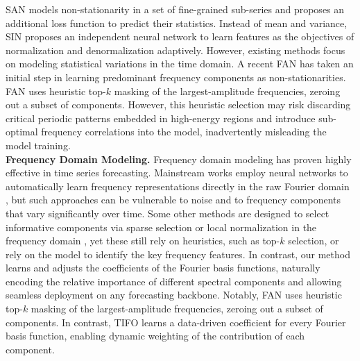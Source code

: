 \documentclass[sigconf,anonymous,review]{acmart}
\newcommand{\methodn}{\textsc{TIFO}}
\newcommand{\method}{\textsc{\methodn}\xspace}
\begin{document}
SAN \citep{liu2023SAN} models non-stationarity in a set of fine-grained sub-series and proposes an additional loss function to predict their statistics.
Instead of mean and variance, SIN \citep{han2024sin} proposes an independent neural network to learn features as the objectives of normalization and denormalization adaptively.
However, existing methods focus on modeling statistical variations in the time domain.
A recent FAN \citep{ye2024FAN} has taken an initial step in learning predominant frequency components as non-stationarities.
FAN uses heuristic top-$k$ masking of the largest-amplitude frequencies, zeroing out a subset of components. 
However, this heuristic selection may risk discarding critical periodic patterns embedded in high-energy regions and introduce sub-optimal frequency correlations into the model, inadvertently misleading the model training.\\
\textbf{Frequency Domain Modeling.}
Frequency domain modeling has proven highly effective in time series forecasting. 
Mainstream works employ neural networks to automatically learn frequency representations directly in the raw Fourier domain \citep{Autoformer, ICMLFedformer, LaST, Timesnet, yi2023frequencyMLP}, but such approaches can be vulnerable to noise and to frequency components that vary significantly over time. 
Some other methods are designed to select informative components via sparse selection \citep{ICMLFedformer, Etsformer, zhou2022film, ye2024FAN} or local normalization in the frequency domain \citep{Piao2024fredformer}, yet these still rely on heuristics, such as top-$k$ selection, or rely on the model to identify the key frequency features.
In contrast, our method learns and adjusts the coefficients of the Fourier basis functions, naturally encoding the relative importance of different spectral components and allowing seamless deployment on any forecasting backbone.
Notably, FAN uses heuristic top-$k$ masking of the largest-amplitude frequencies, zeroing out a subset of components. 
In contrast, \method learns a data-driven coefficient for every Fourier basis function, enabling dynamic weighting of the contribution of each component.
\end{document}
